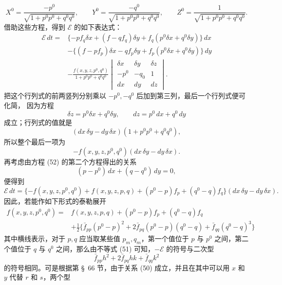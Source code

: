 \documentclass[11pt,a4paper,leqno]{article}
\begin{document}
\[
X^0=\frac{-p^0}{\sqrt{1+p^0p^0+q^0q^0}},\qquad
Y^0=\frac{-q^0}{\sqrt{1+p^0p^0+q^0q^0}},\qquad
Z^0=\frac{1}{\sqrt{1+p^0p^0+q^0q^0}}.
\]
借助这些方程，得到 $\mathcal{E}$ 的如下表达式：
\[
\begin{aligned}
\mathcal{E}\,dt={}&
\{-pf_q\delta x+(f-qf_q)\delta y+f_q(p^0\delta x+q^0\delta y)\}\,dx\\
&-\{(f-pf_p)\delta x-qf_p\delta y+f_p(p^0\delta x+q^0\delta y)\}\,dy\\
&-\frac{f(x,y,z,p^0,q^0)}{1+p^0p^0+q^0q^0}
\begin{vmatrix}
\delta x&\delta y&\delta z\\ -p^0&-q_0&1\\ dx&dy&dz
\end{vmatrix}.
\end{aligned}
\]
把这个行列式的前两竖列分别乘以 $-p^0,-q^0$ 后加到第三列，最后一个行列式便可化简，
因为方程
\begin{equation}\tag{52}
\delta z=p^0\delta x+q^0\delta y,\qquad dz=p^0\,dx+q^0\,dy
\end{equation}
成立；行列式的值就是
\[
(dx\,\delta y-dy\,\delta x)(1+p^0p^0+q^0q^0),
\]
所以整个最后一项为
\[
-f(x,y,z,p^0,q^0)(dx\,\delta y-dy\,\delta x).
\]
再考虑由方程 (52) 的第二个方程得出的关系
\[
(p-p^0)\,dx+(q-q^0)\,dy=0,
\]
便得到
\[
\mathcal{E}\,dt=\{-f(x,y,z,p^0,q^0)+f(x,y,z,p,q)
+(p^0-p)f_p+(q^0-q)f_q\}(dx\,\delta y-dy\,\delta x).
\]
因此，若能作如下形式的泰勒展开
\[
\begin{aligned}
f(x,y,z,p^0,q^0)={}&f(x,y,z,p,q)+(p^0-p)f_p+(q^0-q)f_q\\
&+\frac12\{\bar f_{pp}(p^0-p)^2
+2\bar f_{pq}(p^0-p)(q^0-q)+\bar f_{qq}(q^0-q)^3\}
\end{aligned}
\]
其中横线表示，对于 $p,q$ 应当取某些值 $p_m,q_m$，第一个值位于 $p$ 与 $p^0$
之间，第二个值位于 $q$ 与 $q^0$ 之间，那么由不等式 (51) 可知，$-\mathcal{E}$
的符号与二次型
\[
\bar f_{pp}h^2+2\bar f_{pq}hk+\bar f_{qq}k^2
\]
的符号相同。可是根据第 \S~66 节，由于关系 (50) 成立，并且在其中可以用 $x$
和 $y$ 代替 $r$ 和 $s$，两个型
\end{document}
